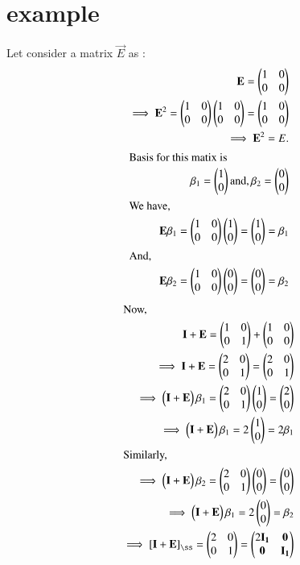 \documentclass[journal,12pt,twocolumn]{IEEEtran}
\begin{document}
	\section{example}
	Let consider a matrix $\vec{E}$ as :
	\begin{align}
	\mathbf{E} =  \begin{pmatrix}1 & 0 \\ 0 & 0\end{pmatrix}\\
	\implies \mathbf{E}^2 = \begin{pmatrix}1 & 0 \\ 0 & 0\end{pmatrix}\begin{pmatrix}1 & 0 \\ 0 & 0\end{pmatrix} = \begin{pmatrix}1 & 0 \\ 0 & 0\end{pmatrix}\\
\implies \mathbf{E}^2 = E.\\
\intertext{Basis for this matix is}
\beta_1 = \begin{pmatrix}1 \\ 0 \end{pmatrix} \text{and}, \beta_2 = \begin{pmatrix}0 \\0\end{pmatrix}\\
\intertext{We have,} 
\mathbf{E}\beta_1 =\begin{pmatrix}1 & 0 \\ 0 & 0\end{pmatrix} \begin{pmatrix}1 \\ 0\end{pmatrix} = \begin{pmatrix}1 \\ 0 \end{pmatrix} = \beta_1\\
\intertext{And,}
\mathbf{E}\beta_2 = \begin{pmatrix}1 & 0 \\ 0 & 0\end{pmatrix}\begin{pmatrix}0 \\ 0 \end{pmatrix}  =  \begin{pmatrix}0 \\ 0\end{pmatrix}= \beta_2
\end{align}
\begin{align}
\intertext{Now,}
\vec{I}+ \vec{E} = \myvec{1 & 0 \\ 0 & 1} + \myvec{ 1 & 0 \\ 0 & 0}\\
\implies \vec{I} + \vec{E} = \myvec{2 & 0 \\ 0 & 1} = \myvec{2 & 0 \\ 0 &1}\\
\implies \myvec{\vec{I} + \vec{E}} \beta_1 = \myvec{2 & 0 \\ 0 &1}\myvec{1 \\ 0} =  \myvec{2 \\ 0}\\
\implies \myvec{\vec{I} + \vec{E}} \beta_1 = 2 \myvec{1 \\ 0} = 2\beta_1\\
\intertext{Similarly,}
\implies \myvec{\vec{I} + \vec{E}} \beta_2 = \myvec{2 & 0 \\ 0 &1}\myvec{0 \\ 0} =  \myvec{0 \\ 0}\\
\implies \myvec{\vec{I} + \vec{E}} \beta_1 = 2 \myvec{0 \\ 0} = \beta_2\\
\implies \left[ \vec{I} + \vec{E}\right]_{\ss} = \myvec{2 & 0 \\ 0 & 1} = \myvec{2 \vec{I_1} & \vec{0} \\ \vec{0} & \vec{I_1}} \label{2.13}
\end{align}	
\end{document}
